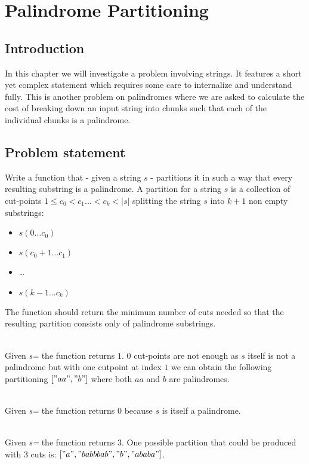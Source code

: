 %

\chapter{Palindrome Partitioning }
\label{ch:palindrome_partitioning2}
\section*{Introduction}
In this chapter we will investigate a problem involving strings. It features a short yet complex 
statement which requires some care to internalize and understand fully. This is another problem on palindromes
where we are asked to calculate the cost of breaking down an input string into chunks such that each of the individual chunks is a palindrome. 

\section{Problem statement}
\begin{exercise}
Write a function that - given a string $s$ - partitions it in such a way that every resulting substring is a
palindrome. A partition for a string $s$ is a collection of cut-points $1 \leq c_0 < c_1 \ldots <
c_k < |s|$ splitting the string $s$ into $k+1$ non empty substrings:
\begin{itemize}
	\item $s(0 \ldots c_0)$
	\item $s(c_0+1 \ldots c_1)$
	\item \ldots
	\item $s(k-1 \ldots c_k)$
\end{itemize}
The function should return the minimum number of cuts needed so that the resulting partition
consists only of palindrome substrings.

\begin{example}
		\hfill \\
		Given \textit{s=} the function returns $1$. $0$ cut-points are not enough as $s$ itself
		is not a palindrome but with one cutpoint at index $1$ we can obtain the following
		partitioning $["aa","b"]$ where both $aa$ and $b$ are palindromes. 
	\end{example}

	\begin{example}
		\hfill \\
		Given \textit{s=} the function returns $0$ because $s$ is itself a
		palindrome. 
	\end{example}

	\begin{example}
		\hfill \\
		Given \textit{s=} the function returns $3$. One possible partition that  could be
		produced with $3$ cuts is: $["a","babbbab","b","ababa"]$.
	\end{example}
\end{exercise}

